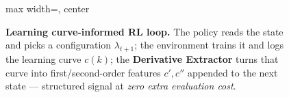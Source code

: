 \begin{figure}
\begin{adjustbox}{max width=\textwidth, center}
\end{adjustbox}
\caption{\textbf{Learning curve-informed RL loop.} The policy reads the state and picks
a configuration $\lambda_{t+1}$; the environment trains it and logs the learning curve
$c(k)$; the \textcolor{orange!80!black}{\textbf{Derivative Extractor}} turns that curve
into first/second-order features $c',c''$ appended to the next state --- structured
signal at \emph{zero extra evaluation cost}.}
\label{fig:framework}
\end{figure}
